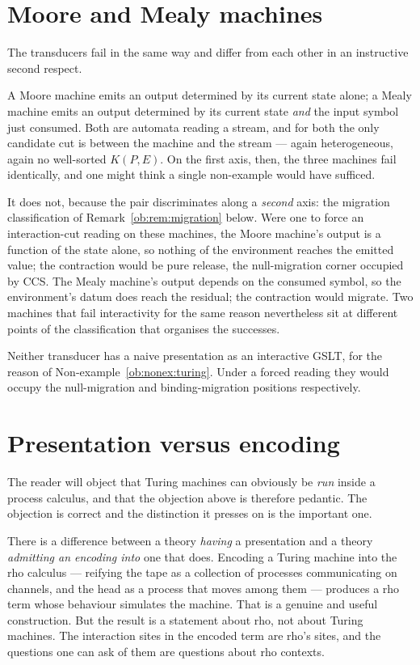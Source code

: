 \section{Moore and Mealy machines}

The transducers fail in the same way and differ from each other in an instructive
second respect.

A Moore machine emits an output determined by its current state alone; a Mealy machine
emits an output determined by its current state \emph{and} the input symbol just
consumed. Both are automata reading a stream, and for both the only candidate cut is
between the machine and the stream --- again heterogeneous, again no well-sorted
$K(P,E)$. On the first axis, then, the three machines fail identically, and one might
think a single non-example would have sufficed.

It does not, because the pair discriminates along a \emph{second} axis: the migration
classification of Remark~\ref{ob:rem:migration} below. Were one to force an interaction-cut
reading on these machines, the Moore machine's output is a function of the state alone,
so nothing of the environment reaches the emitted value; the contraction would be pure
release, the null-migration corner occupied by CCS. The Mealy machine's output depends
on the consumed symbol, so the environment's datum does reach the residual; the
contraction would migrate. Two machines that fail interactivity for the same reason
nevertheless sit at different points of the classification that organises the successes.

\begin{nonexample}
Neither transducer has a naive presentation as an interactive GSLT, for the reason of
Non-example~\ref{ob:nonex:turing}. Under a forced reading they would occupy the
null-migration and binding-migration positions respectively.
\end{nonexample}

\section{Presentation versus encoding}

The reader will object that Turing machines can obviously be \emph{run} inside a process
calculus, and that the objection above is therefore pedantic. The objection is correct
and the distinction it presses on is the important one.

There is a difference between a theory \emph{having} a presentation and a theory
\emph{admitting an encoding into} one that does. Encoding a Turing machine into the rho
calculus --- reifying the tape as a collection of processes communicating on channels,
and the head as a process that moves among them --- produces a rho term whose behaviour
simulates the machine. That is a genuine and useful construction. But the result is a
statement about rho, not about
Turing machines. The interaction sites in the encoded term are rho's sites, and the
questions one can ask of them are questions about rho contexts.

